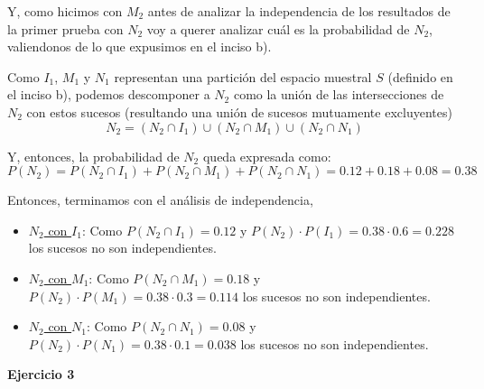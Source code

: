 \documentclass[11pt]{article}
\begin{document}
Y, como hicimos con $M_{2}$ antes de analizar la independencia de los resultados de la primer prueba con $N_{2}$ voy a querer analizar cu\'al es la probabilidad de $N_{2}$, valiendonos de lo que expusimos en el inciso b). 

Como $I_{1}$, $M_{1}$ y $N_{1}$ representan una partici\'on del espacio muestral $S$ (definido en el inciso b), podemos descomponer a $N_{2}$ como la uni\'on de las intersecciones de $N_{2}$ con estos sucesos (resultando una uni\'on de sucesos mutuamente excluyentes)
\[N_{2} = (N_{2} \cap I_{1}) \cup (N_{2} \cap M_{1}) \cup (N_{2} \cap N_{1}) \]

Y, entonces, la probabilidad de $N_{2}$ queda expresada como: 
\[P(N_{2}) = P(N_{2}\cap I_{1}) + P(N_{2}\cap M_{1}) + P(N_{2}\cap N_{1}) = 0.12 + 0.18 + 0.08 = 0.38 \]

Entonces, terminamos con el an\'alisis de independencia,

\begin{itemize}
    \item \underline{$N_{2}$ con $I_{1}$}: Como $P(N_{2}\cap I_{1}) = 0.12$ y $P(N_{2})\cdot P(I_{1}) = 0.38\cdot 0.6 = 0.228$ los sucesos no son independientes. 
    \item \underline{$N_{2}$ con $M_{1}$}: Como $P(N_{2}\cap M_{1}) = 0.18$ y $P(N_{2})\cdot P(M_{1}) = 0.38\cdot 0.3 = 0.114$ los sucesos no son independientes. 
    \item \underline{$N_{2}$ con $N_{1}$}: Como $P(N_{2}\cap N_{1}) = 0.08$ y $P(N_{2})\cdot P(N_{1}) = 0.38\cdot 0.1 = 0.038$ los sucesos no son independientes. 
\end{itemize}

\textbf{Ejercicio 3}
\end{document}
